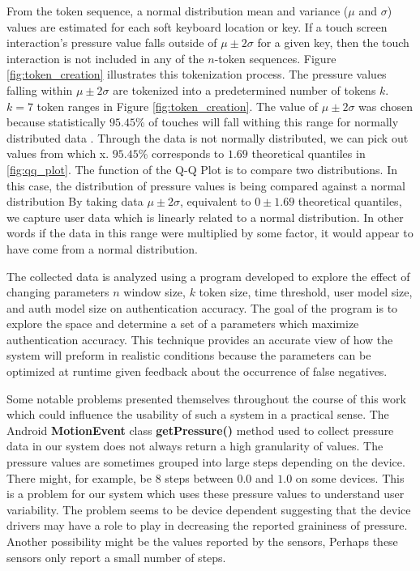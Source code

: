 From the token sequence,
a normal distribution mean and variance ($\mu$ and $\sigma$) 
values are estimated for each soft keyboard location or key.
%
If a touch screen interaction's pressure value falls outside of
$\mu \pm 2\sigma$ for a given key, 
then the touch interaction is not included in any of the $n$-token sequences. 
%
Figure \ref{fig:token_creation} illustrates 
this tokenization process.
%
The pressure values falling within $\mu \pm 2\sigma$ are tokenized
into a predetermined number of tokens $k$. 
$k=7$ token ranges in Figure \ref{fig:token_creation}.
The value of $\mu \pm 2\sigma$ was chosen because statistically $95.45$\% of touches 
will fall withing this range for normally distributed data \cite{threesigmarule}.
%
Through the data is not normally distributed,
we can pick out values from which x.
$95.45$\% corresponds to $1.69$ theoretical quantiles in \ref{fig:qq_plot}.
%
The function of the Q-Q Plot is to 
compare two distributions.
%
In this case,
the distribution of pressure values is being compared against
a normal distribution
%
By taking data $\mu \pm 2\sigma$,
equivalent to $0 \pm 1.69$ theoretical quantiles,
we capture user data which is
linearly related to a normal distribution.
In other words if the data in this range
were multiplied by some factor,
it would appear to have come from a normal distribution.


The collected data is analyzed using a program
developed to explore the effect of changing
parameters
$n$ window size, $k$ token size, time threshold,
user model size, and auth model size on
authentication accuracy.
%
The goal of the program is to
explore the space and determine a
set of a parameters which maximize authentication accuracy.
% 
This technique provides an accurate view of 
how the system will preform in realistic conditions because
the parameters can be optimized at runtime given 
feedback about the occurrence of false negatives.

Some notable problems presented themselves
throughout the course of this work
which could influence the usability of such a 
system in a practical sense.
%
The Android \textbf{MotionEvent} class \textbf{getPressure()} method
used to collect pressure data in our system
does not always return a high granularity of values.
The pressure values are sometimes grouped
into large steps
depending on the device.
%
There might, for example,
be $8$ steps between $0.0$ and $1.0$ on some devices.
This is a problem for our system which uses
these pressure values to understand user variability.
%
The problem seems to be device dependent
suggesting that the device drivers may have a role to play
in decreasing the reported graininess of pressure.
Another possibility might be the values
reported by the sensors,
Perhaps these sensors only report a small number of steps.

